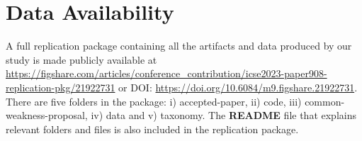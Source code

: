 \section{Data Availability} \label{sec:data-availability}

A full replication package containing all the artifacts and data produced by our study is made publicly available at \url{https://figshare.com/articles/conference_contribution/icse2023-paper908-replication-pkg/21922731} or DOI: \url{https://doi.org/10.6084/m9.figshare.21922731}. There are five folders in the package: i) accepted-paper, ii) code, iii) common-weakness-proposal, iv) data and v) taxonomy. The \textbf{README} file that explains relevant folders and files is also included in the replication package.